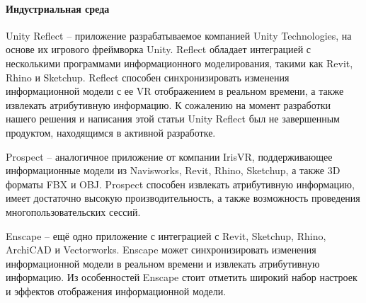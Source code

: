 ﻿\paragraph{Индустриальная среда}

Unity Reflect -- приложение разрабатываемое компанией Unity Technologies,
на основе их игрового фреймворка Unity.%
\cite{UnityReflect}
Reflect обладает интеграцией с несколькими программами информационного моделирования,
такими как Revit, Rhino и Sketchup.
Reflect способен синхронизировать изменения информационной модели с
ее VR отображением в реальном времени, а также извлекать атрибутивную информацию.
К сожалению на момент разработки нашего решения и написания этой статьи
Unity Reflect был не завершенным продуктом, находящимся в активной разработке.

Prospect -- аналогичное приложение от компании IrisVR,
поддерживающее информационные модели
из Navisworks, Revit, Rhino, Sketchup, а также 3D форматы FBX и OBJ.%
\cite{IrisVR}
Prospect способен извлекать атрибутивную информацию,
имеет достаточно высокую производительность,
а также возможность проведения многопользовательских сессий.

Enscape -- ещё одно приложение с интеграцией
с Revit, Sketchup, Rhino, ArchiCAD и Vectorworks.%
\cite{Enscape}
Enscape может синхронизировать изменения информационной модели в реальном времени
и извлекать атрибутивную информацию.
Из особенностей Enscape стоит отметить широкий набор
настроек и эффектов отображения информационной модели.
